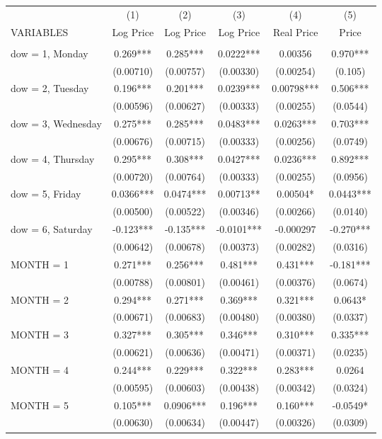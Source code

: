 \begin{tabular}{lccccc} \hline
 & (1) & (2) & (3) & (4) & (5) \\
VARIABLES & Log Price & Log Price & Log Price & Real Price & Price \\ \hline
 &  &  &  &  &  \\
dow = 1, Monday & 0.269*** & 0.285*** & 0.0222*** & 0.00356 & 0.970*** \\
 & (0.00710) & (0.00757) & (0.00330) & (0.00254) & (0.105) \\
dow = 2, Tuesday & 0.196*** & 0.201*** & 0.0239*** & 0.00798*** & 0.506*** \\
 & (0.00596) & (0.00627) & (0.00333) & (0.00255) & (0.0544) \\
dow = 3, Wednesday & 0.275*** & 0.285*** & 0.0483*** & 0.0263*** & 0.703*** \\
 & (0.00676) & (0.00715) & (0.00333) & (0.00256) & (0.0749) \\
dow = 4, Thursday & 0.295*** & 0.308*** & 0.0427*** & 0.0236*** & 0.892*** \\
 & (0.00720) & (0.00764) & (0.00333) & (0.00255) & (0.0956) \\
dow = 5, Friday & 0.0366*** & 0.0474*** & 0.00713** & 0.00504* & 0.0443*** \\
 & (0.00500) & (0.00522) & (0.00346) & (0.00266) & (0.0140) \\
dow = 6, Saturday & -0.123*** & -0.135*** & -0.0101*** & -0.000297 & -0.270*** \\
 & (0.00642) & (0.00678) & (0.00373) & (0.00282) & (0.0316) \\
MONTH = 1 & 0.271*** & 0.256*** & 0.481*** & 0.431*** & -0.181*** \\
 & (0.00788) & (0.00801) & (0.00461) & (0.00376) & (0.0674) \\
MONTH = 2 & 0.294*** & 0.271*** & 0.369*** & 0.321*** & 0.0643* \\
 & (0.00671) & (0.00683) & (0.00480) & (0.00380) & (0.0337) \\
MONTH = 3 & 0.327*** & 0.305*** & 0.346*** & 0.310*** & 0.335*** \\
 & (0.00621) & (0.00636) & (0.00471) & (0.00371) & (0.0235) \\
MONTH = 4 & 0.244*** & 0.229*** & 0.322*** & 0.283*** & 0.0264 \\
 & (0.00595) & (0.00603) & (0.00438) & (0.00342) & (0.0324) \\
MONTH = 5 & 0.105*** & 0.0906*** & 0.196*** & 0.160*** & -0.0549* \\
 & (0.00630) & (0.00634) & (0.00447) & (0.00326) & (0.0309) \\

\end{tabular}
